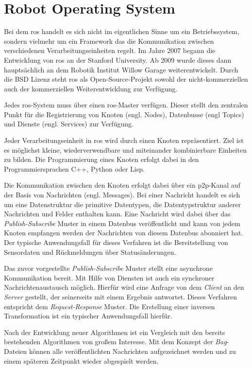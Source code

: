\section{Robot Operating System}

Bei dem \Gls{ros} handelt es sich nicht im eigentlichen Sinne um ein Betriebssystem, sondern vielmehr um ein Framework das die Kommunikation zwischen verschiedenen Verarbeitungseinheiten regelt. Im Jahre 2007 begann die Entwicklung von \Gls{ros} an der Stanford University. Ab 2009 wurde dieses dann hauptsächlich an dem Robotik Institut Willow Garage weiterentwickelt. Durch die BSD Lizenz steht \Gls{ros} als Open-Source-Projekt sowohl der nicht-kommerziellen auch der kommerziellen Weiterentwicklung zur Verfügung. \cite{quigley2009ros}

Jedes \Gls{ros}-System muss über einen \Gls{ros}-Master verfügen. Dieser stellt den zentralen Punkt für die Registrierung von Knoten (engl. Nodes), Datenbusse (engl Topics) und Dienste (engl. Services) zur Verfügung.

Jeder Verarbeitungseinheit in \Gls{ros} wird durch einen Knoten repräsentiert. Ziel ist es möglichst kleine, wiederverwendbare und miteinander kombinierbare Einheiten zu bilden. Die Programmierung eines Knoten erfolgt dabei in den Programmiersprachen C++, Python oder Lisp.

Die Kommunikation zwischen den Knoten erfolgt dabei über ein \Gls{p2p}-Kanal auf der Basis von Nachrichten (engl. Messages). Bei einer Nachricht handelt es sich um eine Datenstruktur die primitive Datentypen, die Datentypstruktur anderer Nachrichten und Felder enthalten kann. Eine Nachricht wird dabei über das \textit{Publish-Subscribe} Muster in einem Datenbus veröffentlicht und kann von jedem Knoten empfangen werden der Nachrichten von diesem Datenbus abonniert hat. Der typische Anwendungsfall für dieses Verfahren ist die Bereitstellung von Sensordaten und Rückmeldungen über Statusänderungen.

Das zuvor vorgestellte \textit{Publish-Subscribe} Muster stellt eine asynchrone Kommunikation bereit. Mit Hilfe von Diensten ist auch ein synchroner Nachrichtenaustausch möglich. Hierfür wird eine Anfrage von dem \textit{Client} an den \textit{Server} gestellt, der seinerseits mit einem Ergebnis antwortet. Dieses Verfahren entspricht dem \textit{Request-Response} Muster. Die Erstellung einer inversen Transformation ist ein typischer Anwendungsfall hierfür.

Nach der Entwicklung neuer Algorithmen ist ein Vergleich mit den bereits bestehenden Algorithmen von großem Interesse. Mit dem Konzept der \textit{Bag}-Dateien können alle veröffentlichten Nachrichten aufgezeichnet werden und zu einem späteren Zeitpunkt wieder abgespielt werden.

